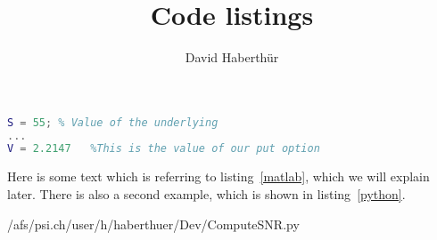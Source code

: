 \documentclass[paper=a4,DIV=calc]{article}
\title{Code listings}
\author{David Haberthür}
\begin{document}
\maketitle

\blindtext

\begin{lstlisting}[language=Matlab,
	frame=single,
	caption=Some Matlab code,
	label=matlab]
S = 55; % Value of the underlying
...
V = 2.2147   %This is the value of our put option
\end{lstlisting}

Here is some text which is referring to listing~\ref{matlab}, which we will explain later. There is also a second example, which is shown in listing~\ref{python}.



	{/afs/psi.ch/user/h/haberthuer/Dev/ComputeSNR.py}

\blindtext
\end{document}

